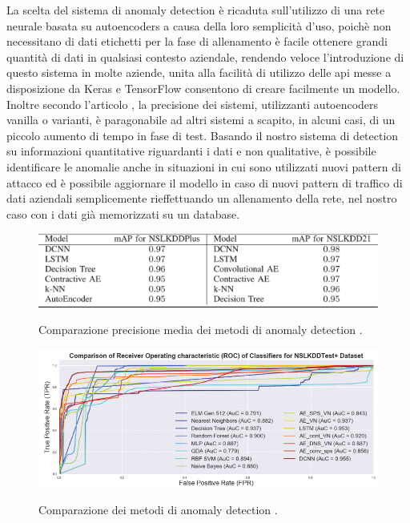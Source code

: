 La scelta del sistema di anomaly detection è ricaduta sull'utilizzo di una rete neurale basata su autoencoders a causa della loro semplicità d'uso, poichè non necessitano di dati etichetti per la fase di allenamento è facile ottenere grandi quantità di dati in qualsiasi contesto aziendale, rendendo veloce l'introduzione di questo sistema in molte aziende, unita alla facilità di utilizzo delle api messe a disposizione da Keras e TensorFlow consentono di creare facilmente un modello.
Inoltre secondo l'articolo \cite{anomaly_detection_comparativa}, la precisione dei sistemi, utilizzanti autoencoders vanilla o varianti, è paragonabile ad altri sistemi a scapito, in alcuni casi, di un piccolo aumento di tempo in fase di test.
Basando il nostro sistema di detection su informazioni quantitative riguardanti i dati e non qualitative, è possibile identificare le anomalie anche in situazioni in cui sono utilizzati nuovi pattern di attacco ed è possibile aggiornare il modello in caso di nuovi pattern di traffico di dati aziendali semplicemente rieffettuando un allenamento della rete, nel nostro caso con i dati già memorizzati su un database.

\begin{figure}[]
    \begin{center}
    \label{fig:anomaly_comparazione_1}
    \includegraphics[width=\hsize]{images/reti_neurali/precisione_media.png}
    \caption{Comparazione precisione media dei metodi di anomaly detection \cite{anomaly_detection_comparativa}.}
    \centering
    \end{center}
\end{figure}

\begin{figure}[]
    \begin{center}
    \label{fig:anomaly_comparazione_2}
    \includegraphics[width=\hsize]{images/reti_neurali/comparazione.png}
    \caption{Comparazione dei metodi di anomaly detection \cite{anomaly_detection_comparativa}.}
    \centering
    \end{center}
\end{figure}

